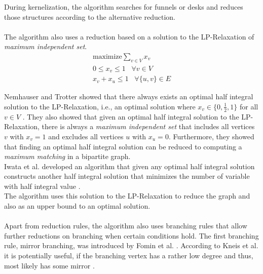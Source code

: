 \documentclass[]{article}
\begin{document}
During kernelization, the algorithm searches for funnels or desks and reduces those structures according to the alternative reduction.\\\\
The algorithm also uses a reduction based on a solution to the LP-Relaxation of \textit{maximum independent set}.
\begin{gather*}
	\text{maximize} \sum_{v\in V}x_v\\
	0\leq x_v\leq 1 \;\;\; \forall v\in V\\
	x_v + x_u\leq 1 \;\;\; \forall \{u,v\}\in E
\end{gather*}

Nemhauser and Trotter showed that there always exists an optimal half integral solution to the LP-Relaxation, i.e., an optimal solution where $x_v\in\{0,\frac{1}{2},1\}$ for all $v\in V$ \cite{NemhauserTrotter}. They also showed that given an optimal half integral solution to the LP-Relaxation, there is always a \textit{maximum independent set} that includes all vertices $v$ with $x_v=1$ and excludes all vertices $u$ with $x_u = 0$. Furthermore, they showed that finding an optimal half integral solution can be reduced to computing a \textit{maximum matching} in a bipartite graph. \\
Iwata et al. developed an algorithm that given any optimal half integral solution constructs another half integral solution that minimizes the number of variable with half integral value \cite{IwataOkaYoshida}.\\
The algorithm uses this solution to the LP-Relaxation to reduce the graph and also as an upper bound to an optimal solution.\\\\
Apart from reduction rules, the algorithm also uses branching rules that allow further reductions on branching when certain conditions hold. The first branching rule, mirror branching, was introduced by Fomin et al. \cite{Fomin}. According to Kneis et al. it is potentially useful, if the branching vertex has a rather low degree and thus, most likely has some mirror \cite{Kneis}.
\end{document}
